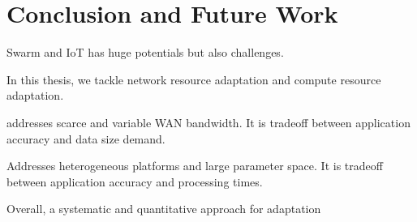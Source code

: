 \documentclass[thesis.tex]{subfiles}
\begin{document}
\chapter{Conclusion and Future Work}
\label{cha:concl-future-work}

Swarm and IoT has huge potentials but also challenges.

In this thesis, we tackle network resource adaptation and compute resource
adaptation.

 \sysname{} addresses scarce and variable WAN
bandwidth. It is tradeoff between application accuracy and data size demand.

 Addresses heterogeneous platforms and large
parameter space. It is tradeoff between application accuracy and processing
times.

Overall, a systematic and quantitative approach for adaptation
\end{document}

